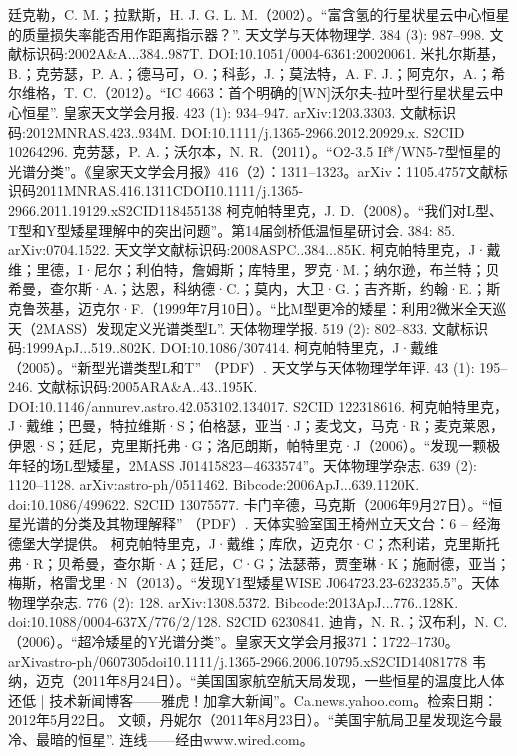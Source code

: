 \begin{enumerate}
 廷克勒，C. M.；拉默斯，H. J. G. L. M.（2002）。“富含氢的行星状星云中心恒星的质量损失率能否用作距离指示器？”. 天文学与天体物理学. 384 (3): 987–998. 文献标识码:2002A&A...384..987T. DOI:10.1051/0004-6361:20020061.
 米扎尔斯基，B.；克劳瑟，P. A.；德马可，O.；科彭，J.；莫法特，A. F. J.；阿克尔，A.；希尔维格，T. C.（2012）。“IC 4663：首个明确的[WN]沃尔夫-拉叶型行星状星云中心恒星”. 皇家天文学会月报. 423 (1): 934–947. arXiv:1203.3303. 文献标识码:2012MNRAS.423..934M. DOI:10.1111/j.1365-2966.2012.20929.x. S2CID 10264296.
 克劳瑟，P. A.；沃尔本，N. R.（2011）。“O2-3.5 If*/WN5-7型恒星的光谱分类”。《皇家天文学会月报》416（2）：1311–1323。arXiv：1105.4757文献标识码2011MNRAS.416.1311CDOI10.1111/j.1365-2966.2011.19129.xS2CID118455138
 柯克帕特里克，J. D.（2008）。“我们对L型、T型和Y型矮星理解中的突出问题”。第14届剑桥低温恒星研讨会. 384: 85. arXiv:0704.1522. 天文学文献标识码:2008ASPC..384...85K.
 柯克帕特里克，J·戴维；里德，I·尼尔；利伯特，詹姆斯；库特里，罗克·M.；纳尔逊，布兰特；贝希曼，查尔斯·A.；达恩，科纳德·C.；莫内，大卫·G.；吉齐斯，约翰·E.；斯克鲁茨基，迈克尔·F.（1999年7月10日）。“比M型更冷的矮星：利用2微米全天巡天（2MASS）发现定义光谱类型L”. 天体物理学报. 519 (2): 802–833. 文献标识码:1999ApJ...519..802K. DOI:10.1086/307414.
 柯克帕特里克，J·戴维（2005）。“新型光谱类型L和T” （PDF）. 天文学与天体物理学年评. 43 (1): 195–246. 文献标识码:2005ARA&A..43..195K. DOI:10.1146/annurev.astro.42.053102.134017. S2CID 122318616.
 柯克帕特里克，J·戴维；巴曼，特拉维斯·S；伯格瑟，亚当·J；麦戈文，马克·R；麦克莱恩，伊恩·S；廷尼，克里斯托弗·G；洛厄朗斯，帕特里克·J（2006）。“发现一颗极年轻的场L型矮星，2MASS J01415823−4633574”。天体物理学杂志. 639 (2): 1120–1128. arXiv:astro-ph/0511462. Bibcode:2006ApJ...639.1120K. doi:10.1086/499622. S2CID 13075577.
 卡门辛德，马克斯（2006年9月27日）。“恒星光谱的分类及其物理解释” （PDF）. 天体实验室国王椅州立天文台：6 – 经海德堡大学提供。
 柯克帕特里克，J·戴维；库欣，迈克尔·C；杰利诺，克里斯托弗·R；贝希曼，查尔斯·A；廷尼，C·G；法瑟蒂，贾奎琳·K；施耐德，亚当；梅斯，格雷戈里·N（2013）。“发现Y1型矮星WISE J064723.23-623235.5”。天体物理学杂志. 776 (2): 128. arXiv:1308.5372. Bibcode:2013ApJ...776..128K. doi:10.1088/0004-637X/776/2/128. S2CID 6230841.
 迪肯，N. R.；汉布利，N. C.（2006）。“超冷矮星的Y光谱分类”。皇家天文学会月报371：1722–1730。arXivastro-ph/0607305doi10.1111/j.1365-2966.2006.10795.xS2CID14081778
 韦纳，迈克（2011年8月24日）。“美国国家航空航天局发现，一些恒星的温度比人体还低 | 技术新闻博客——雅虎！加拿大新闻”。Ca.news.yahoo.com。检索日期：2012年5月22日。
 文顿，丹妮尔（2011年8月23日）。“美国宇航局卫星发现迄今最冷、最暗的恒星”. 连线——经由www.wired.com。

\end{enumerate}
